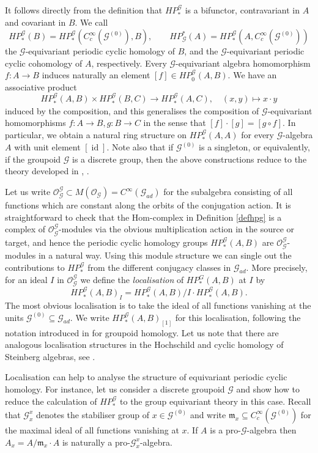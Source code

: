 \documentclass{amsart}
\newcommand{\G}{\mathcal{G}}
\newcommand{\OG}{\mathcal{O}_{\mathcal{G}}}
\newcommand{\ccinfty}{C_c^\infty}
\newcommand{\cinfty}{C^\infty}
\DeclareMathOperator{\id}{id}
\begin{document}
It follows directly from the definition that $ HP^\G_* $ is a bifunctor, contravariant in $ A $ and covariant in $ B $. We call 
$$
HP^\G_*(B) = HP_*^\G(\ccinfty(\G^{(0)}), B), \qquad HP^*_\G(A) = HP^\G_*(A, \ccinfty(\G^{(0)}))
$$
the $ \G $-equivariant periodic cyclic homology of $ B $, and the $ \G $-equivariant periodic cyclic cohomology of $ A $, respectively. 
Every $ \G $-equivariant algebra homomorphism $ f: A \rightarrow B $ induces naturally an element $ [f] \in HP^\G_0(A,B) $. We have an associative product 
$$ 
HP^\G_*(A,B) \times HP^\G_*(B,C) \rightarrow HP^\G_*(A,C), \quad (x,y) \mapsto x \cdot y 
$$ 
induced by the composition, and this generalises the composition of $ \G $-equivariant homomorphisms $ f: A \rightarrow B, g: B \rightarrow C $ in the sense that $ [f] \cdot [g] = [g \circ f] $. In particular, we obtain a natural ring structure on $ HP^\G_*(A,A) $ for every $ \G $-algebra $ A $ with unit element $ [\id] $. Note also that if $ \G^{(0)} $ is a singleton, or equivalently, if the groupoid $ \G $ is a discrete group, then the above constructions reduce to the theory developed in \cite{VOIGT_thesis}, \cite{VOIGT_equivariantperiodiccyclichomology}. 

Let us write $ \OG^\G \subset M(\OG) = \cinfty(\G_{ad}) $ for the subalgebra consisting of all functions which are constant along the orbits of the conjugation action. 
It is straightforward to check that the Hom-complex in Definition \ref{defhpg} is a complex of $ \OG^\G $-modules via the obvious multiplication action in the source or target, and hence the periodic cyclic homology groups $ HP^\G_*(A,B) $ are $ \OG^\G $-modules in a natural way. 
Using this module structure we can single out the contributions to $ HP^\G_* $ from the different conjugacy classes in $ \G_{ad} $. More precisely, for an ideal $ I $ in $ \OG^\G $ we define the \emph{localisation} of $ HP^G_*(A,B) $ at $ I $ by
$$
HP^\G_*(A,B)_I = HP^\G_*(A,B)/I \cdot HP^\G_*(A,B).
$$
The most obvious localisation is to take the ideal of all functions vanishing at the units $ \G^{(0)} \subseteq \G_{ad} $. We write $ HP^\G_*(A,B)_{[1]} $ for this localisation, following the notation introduced in  \cite{CRAINIC_MOERDIJK_homologyetalegroupoids} for groupoid homology. Let us note that there are analogous localisation structures in the Hochschild and cyclic homology of Steinberg algebras, see  \cite{ARNONE_CORTINAS_MUKHERJEE_homologysteinberg}. 

Localisation can help to analyse the structure of equivariant periodic cyclic homology. For instance, let us consider a discrete groupoid $ \G $ and show how to reduce the calculation of $ HP^\G_* $ to the group equivariant theory in this case. Recall that $ \G^x_x $ denotes the stabiliser group of $ x \in \G^{(0)} $ and 
write $ \mathfrak{m}_x \subseteq \ccinfty(\G^{(0)}) $ for the maximal ideal of all functions vanishing at $ x $. If $ A $ is a pro-$ \G $-algebra 
then $ A_x = A/\mathfrak{m}_x \cdot A $ is naturally a pro-$ \G_x^x $-algebra. 
\end{document}

